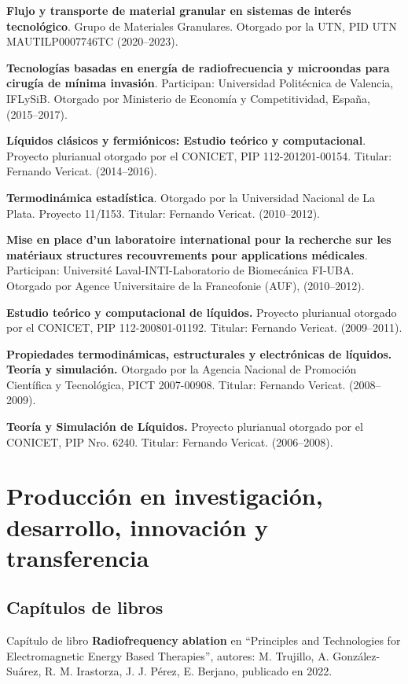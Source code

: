 \documentclass[margin,line]{res}
\begin{document}
\begin{resume}
\textbf{Flujo y transporte de material granular en sistemas de interés tecnológico}. Grupo de Materiales Granulares. Otorgado por la UTN, PID UTN MAUTILP0007746TC (2020--2023).

\textbf{Tecnologías basadas en energía de radiofrecuencia y microondas para cirugía de mínima invasión}. Participan: Universidad Politécnica de Valencia, IFLySiB. Otorgado por Ministerio de Economía y Competitividad, España, (2015--2017).

\textbf{Líquidos clásicos y fermiónicos: Estudio teórico y computacional}. Proyecto plurianual otorgado por el CONICET, PIP 112-201201-00154. Titular: Fernando Vericat. (2014--2016).

\textbf{Termodinámica estadística}. Otorgado por la Universidad Nacional de La Plata. Proyecto 11/I153. Titular: Fernando Vericat. (2010--2012). 

\textbf{Mise en place d’un laboratoire international pour la recherche sur les matériaux structures recouvrements pour applications médicales}. Participan: Université Laval-INTI-Laboratorio de Biomecánica FI-UBA. Otorgado por Agence Universitaire de la Francofonie (AUF), (2010--2012).

\textbf{Estudio teórico y computacional de líquidos.} Proyecto plurianual otorgado por el CONICET, PIP  112-200801-01192. Titular: Fernando Vericat. (2009--2011).

\textbf{Propiedades termodinámicas, estructurales y electrónicas de líquidos. Teoría y simulación.} Otorgado por la Agencia Nacional de Promoción Científica y Tecnológica, PICT 2007-00908. Titular: Fernando Vericat. (2008--2009).

\textbf{Teoría y Simulación de Líquidos.} Proyecto plurianual otorgado por el CONICET, PIP Nro. 6240. Titular: Fernando Vericat. (2006--2008).

\bigskip

\section{ Producción en investigación, desarrollo, innovación y transferencia}
\vspace*{-.2in}

\subsection{ Capítulos de libros} 

Capítulo de libro \textbf{Radiofrequency ablation} en ``Principles and Technologies for Electromagnetic Energy Based Therapies'', autores: M. Trujillo, A. González-Suárez, R. M. Irastorza, J. J. Pérez, E. Berjano, publicado en 2022.



\end{resume}
\end{document}
